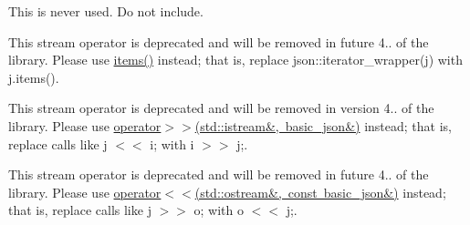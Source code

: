 
\begin{DoxyRefList}
\item[Member \mbox{\hyperlink{a00392_ga712f182888672382dd4a1776f850915a}{Get\+Size\+Of\+Edge\+Vector}} (const std\+::vector$<$ H\+F\+::\+Spatial\+Structures\+::\+Edge $>$ $\ast$edge\+\_\+list, int $\ast$out\+\_\+size)]\label{a00387__deprecated000004}%
%
This is never used. Do not include.  
\item[Member \mbox{\hyperlink{a01605_a0a8051760196ac813fd5eb3c8d5a2976}{nlohmann::basic\+\_\+json::iterator\+\_\+wrapper}} (reference ref) noexcept]\label{a00387__deprecated000001}%
%
This stream operator is deprecated and will be removed in future 4.. of the library. Please use \mbox{\hyperlink{a01605_a5961446010dfc494e0c247b4e9026977}{items()}} instead; that is, replace {\ttfamily json\+::iterator\+\_\+wrapper(j)} with {\ttfamily j.\+items()}.  
\item[Member \mbox{\hyperlink{a01605_a60ca396028b8d9714c6e10efbf475af6}{nlohmann::basic\+\_\+json::operator$<$$<$}} (\mbox{\hyperlink{a01605}{basic\+\_\+json}} \&j, std\+::istream \&i)]\label{a00387__deprecated000003}%
%
This stream operator is deprecated and will be removed in version 4.. of the library. Please use \mbox{\hyperlink{a01605_aaf363408931d76472ded14017e59c9e8}{operator$>$$>$(std\+::istream\&, basic\+\_\+json\&)}} instead; that is, replace calls like {\ttfamily j $<$$<$ i;} with {\ttfamily i $>$$>$ j;}.  
\item[Member \mbox{\hyperlink{a01605_a34d6a60dd99e9f33b8273a1c8db5669b}{nlohmann::basic\+\_\+json::operator$>$$>$}} (const \mbox{\hyperlink{a01605}{basic\+\_\+json}} \&j, std\+::ostream \&o)]\label{a00387__deprecated000002}%
%
This stream operator is deprecated and will be removed in future 4.. of the library. Please use \mbox{\hyperlink{a01605_a5e34c5435e557d0bf666bd7311211405}{operator$<$$<$(std\+::ostream\&, const basic\+\_\+json\&)}} instead; that is, replace calls like {\ttfamily j $>$$>$ o;} with {\ttfamily o $<$$<$ j;}. 
\end{DoxyRefList}